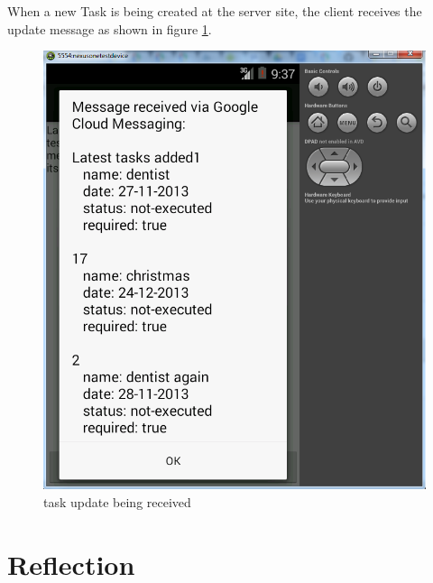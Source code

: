 \pagebreak
When a new Task is being created at the server site, the client receives the update message as shown in figure \ref{mobile_task_update_figure}.
\begin{figure}[H]
	\centering
	\includegraphics[scale=0.7]{images/googlecloud__tasksindevice.png}
	\caption{task update being received}
	\label{mobile_task_update_figure}
\end{figure}


\section{Reflection}

